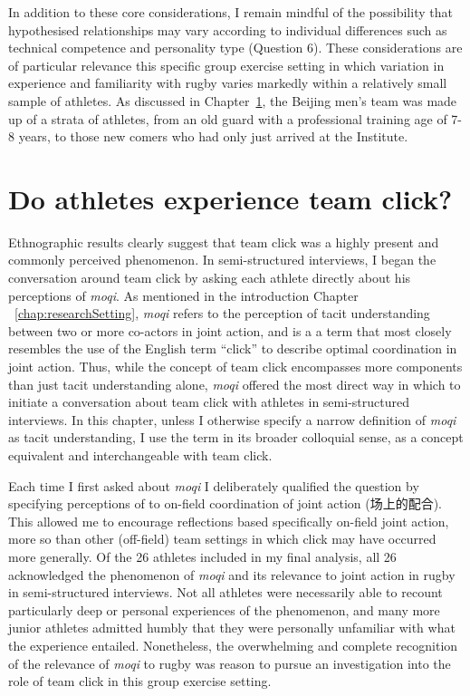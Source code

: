 \begin{CJK}{UTF8}{gbsn}
In addition to these core considerations, I remain mindful of the possibility that hypothesised relationships may vary according to individual differences such as technical competence and personality type (Question 6).  These considerations are of particular relevance this specific group exercise setting in which variation in experience and familiarity with rugby varies markedly within a relatively small sample of athletes.  As discussed in Chapter~\ref{}, the Beijing men's team was made up of a strata of athletes, from an old guard with a professional training age of 7-8 years, to those new comers who had only just arrived at the Institute.



\section{Do athletes experience team click?}
Ethnographic results clearly suggest that team click was a highly present and commonly perceived phenomenon.   In semi-structured interviews, I began the conversation around team click by asking each athlete directly about his perceptions of \textit{moqi}.  As mentioned in the introduction Chapter ~\ref{chap:researchSetting}, \textit{moqi} refers to the perception of tacit understanding between two or more co-actors in joint action, and is a a term that most closely resembles the use of the English term ``click'' to describe optimal coordination in joint action.  Thus, while the concept of team click encompasses more components than just tacit understanding alone, \textit{moqi} offered the most direct way in which to initiate a conversation about team click with athletes in semi-structured interviews.  In this chapter, unless I otherwise specify a narrow definition of \textit{moqi} as tacit understanding, I use the term in its broader colloquial sense, as a concept equivalent and interchangeable with team click.

Each time I first asked about \textit{moqi} I deliberately qualified the question by specifying perceptions of to on-field coordination of joint action (场上的配合).  This allowed me to encourage reflections based specifically on-field joint action, more so than other (off-field) team settings in which click may have occurred more generally.  Of the 26 athletes included in my final analysis, all 26 acknowledged the phenomenon of \textit{moqi} and its relevance to joint action in rugby in semi-structured interviews.  Not all athletes were necessarily able to recount particularly deep or personal experiences of the phenomenon, and many more junior athletes admitted humbly that they were personally unfamiliar with what the experience entailed.  Nonetheless, the overwhelming and complete recognition of the relevance of \textit{moqi} to rugby was reason to pursue an investigation into the role of team click in this group exercise setting.


\end{CJK}

